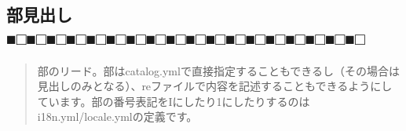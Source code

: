 \begin{reviewpart}

\part{部見出し■□■□■□■□■□■□■□■□■□■□■□■□■□■□■□■□■□■□}
\label{chap:part2}

\begin{quotation}
部のリード。部はcatalog.ymlで直接指定することもできるし（その場合は見出しのみとなる）、reファイルで内容を記述することもできるようにしています。部の番号表記をIにしたり1にしたりするのはi18n.yml/locale.ymlの定義です。
\end{quotation}

\end{reviewpart}
